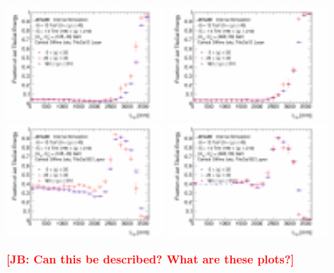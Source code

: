 \begin{figure}[hbtp]
\begin{center}
\includegraphics[width=0.47\textwidth]{figures/caloratio1.pdf}
\includegraphics[width=0.47\textwidth]{figures/caloratio2.pdf}\\
\includegraphics[width=0.47\textwidth]{figures/caloratio3.pdf}
\includegraphics[width=0.47\textwidth]{figures/caloratio4.pdf}\\
\caption{ {\bf \textcolor{red}{[JB: Can this be described?  What are these plots?]}}
}
\label{fig:Caloratio}
\end{center}
\end{figure}


